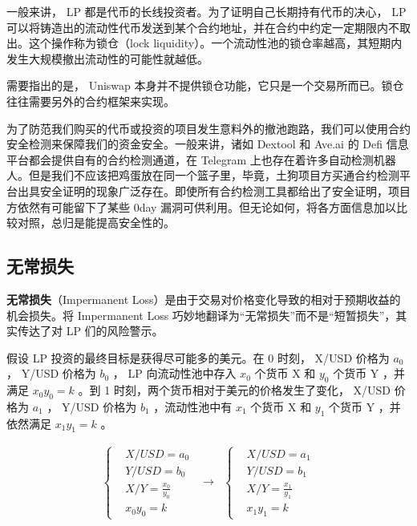 \documentclass[12pt, a4paper, oneside]{ctexart}
\begin{document}
一般来讲， LP 都是代币的长线投资者。为了证明自己长期持有代币的决心， LP 可以将铸造出的流动性代币发送到某个合约地址，并在合约中约定一定期限内不取出。这个操作称为锁仓（lock liquidity）。一个流动性池的锁仓率越高，其短期内发生大规模撤出流动性的可能性就越低。

需要指出的是， Uniswap 本身并不提供锁仓功能，它只是一个交易所而已。锁仓往往需要另外的合约框架来实现。

为了防范我们购买的代币或投资的项目发生意料外的撤池跑路，我们可以使用合约安全检测来保障我们的资金安全。一般来讲，诸如 Dextool 和 Ave.ai 的 Defi 信息平台都会提供自有的合约检测通道，在 Telegram 上也存在着许多自动检测机器人。但是我们不应该把鸡蛋放在同一个篮子里，毕竟，土狗项目方买通合约检测平台出具安全证明的现象广泛存在。即使所有合约检测工具都给出了安全证明，项目方依然有可能留下了某些 0day 漏洞可供利用。但无论如何，将各方面信息加以比较对照，总归是能提高安全性的。

\subsection{无常损失}

\textbf{无常损失}（Impermanent Loss）是由于交易对价格变化导致的相对于预期收益的机会损失。将 Impermanent Loss 巧妙地翻译为“无常损失”而不是“短暂损失”，其实传达了对 LP 们的风险警示。

假设 LP 投资的最终目标是获得尽可能多的美元。在 0 时刻， X/USD 价格为 $a_0$ ， Y/USD 价格为 $b_0$ ， LP 向流动性池中存入 $x_0$ 个货币 X 和 $y_0$ 个货币 Y ，并满足 $x_0y_0=k$ 。到 1 时刻，两个货币相对于美元的价格发生了变化， X/USD 价格为 $a_1$ ， Y/USD 价格为 $b_1$ ，流动性池中有 $x_1$ 个货币 X 和 $y_1$ 个货币 Y ，并依然满足 $x_1y_1=k$ 。

\begin{equation}
    \begin{matrix}
        \left\{ 
            \begin{aligned}
                & X/USD = a_0 \\
                & Y/USD = b_0 \\
                & X/Y = \frac{x_0}{y_0}\\
                & x_0y_0 = k
            \end{aligned}
        \right.
        & \rightarrow &
        \left\{ 
            \begin{aligned}
                & X/USD = a_1 \\
                & Y/USD = b_1 \\
                & X/Y = \frac{x_1}{y_1}\\
                & x_1y_1 = k
            \end{aligned}
        \right.
    \end{matrix}
\end{equation}
\end{document}
